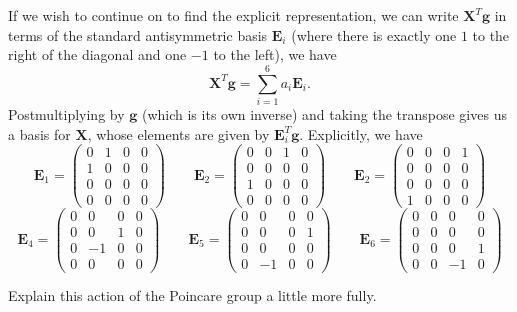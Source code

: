 \documentclass[../road-to-reality.tex]{subfiles}
\begin{document}
\begin{questions}
\begin{solution}
    If we wish to continue on to find the explicit representation, we can write $\mathbf{X}^T\mathbf{g}$ in terms of the standard antisymmetric basis $\mathbf{E}_i$ (where there is exactly one $1$ to the right of the diagonal and one $-1$ to the left), we have
    \[
      \mathbf{X}^T\mathbf{g} = \sum_{i=1}^6a_i\mathbf{E}_i
      .\] 
    Postmultiplying by $\mathbf{g}$ (which is its own inverse) and taking the transpose gives us a basis for $\mathbf{X}$, whose elements are given by $\mathbf{E}_i^T\mathbf{g}$. Explicitly, we have
    \[
      \mathbf{E}_1 = \begin{pmatrix} 0 & 1 & 0 & 0 \\ 1 & 0 & 0 & 0 \\ 0 & 0 & 0 & 0 \\ 0 & 0 & 0 & 0 \end{pmatrix} \qquad
      \mathbf{E}_2 = \begin{pmatrix} 0 & 0 & 1 & 0 \\ 0 & 0 & 0 & 0 \\ 1 & 0 & 0 & 0 \\ 0 & 0 & 0 & 0 \end{pmatrix} \qquad
      \mathbf{E}_2 = \begin{pmatrix} 0 & 0 & 0 & 1 \\ 0 & 0 & 0 & 0 \\ 0 & 0 & 0 & 0 \\ 1 & 0 & 0 & 0 \end{pmatrix}
    \] 
    \[
      \mathbf{E}_4 = \begin{pmatrix} 0 & 0 & 0 & 0 \\ 0 & 0 & 1 & 0 \\ 0 & -1 & 0 & 0 \\ 0 & 0 & 0 & 0 \end{pmatrix} \qquad
      \mathbf{E}_5 = \begin{pmatrix} 0 & 0 & 0 & 0 \\ 0 & 0 & 0 & 1 \\ 0 & 0 & 0 & 0 \\ 0 & -1 & 0 & 0 \end{pmatrix} \qquad
      \mathbf{E}_6 = \begin{pmatrix} 0 & 0 & 0 & 0 \\ 0 & 0 & 0 & 0 \\ 0 & 0 & 0 & 1 \\ 0 & 0 & -1 & 0 \end{pmatrix}
    \] 
  \end{solution}

\question Explain this action of the Poincare group a little more fully.


\end{questions}
\end{document}
